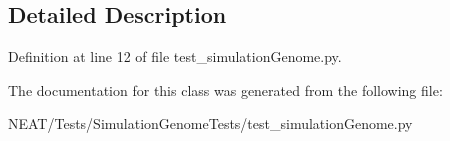 \subsection{Detailed Description}


Definition at line 12 of file test\+\_\+simulation\+Genome.\+py.



The documentation for this class was generated from the following file\+:\begin{DoxyCompactItemize}
\item 
N\+E\+A\+T/\+Tests/\+Simulation\+Genome\+Tests/test\+\_\+simulation\+Genome.\+py\end{DoxyCompactItemize}
